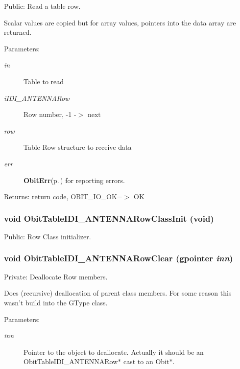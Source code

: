 Public: Read a table row. 

Scalar values are copied but for array values, pointers into the data array are returned. \begin{Desc}
\item[Parameters:]
\begin{description}
\item[{\em in}]Table to read \item[{\em i\-IDI\_\-ANTENNARow}]Row number, -1 -$>$ next \item[{\em row}]Table Row structure to receive data \item[{\em err}]{\bf Obit\-Err}{\rm (p.\,\pageref{structObitErr})} for reporting errors. \end{description}
\end{Desc}
\begin{Desc}
\item[Returns:]return code, OBIT\_\-IO\_\-OK=$>$ OK \end{Desc}
\subsubsection{\setlength{\rightskip}{0pt plus 5cm}void Obit\-Table\-IDI\_\-ANTENNARow\-Class\-Init (void)}\label{ObitTableIDI__ANTENNA_8c_a26}


Public: Row Class initializer. 

\subsubsection{\setlength{\rightskip}{0pt plus 5cm}void Obit\-Table\-IDI\_\-ANTENNARow\-Clear (gpointer {\em inn})}\label{ObitTableIDI__ANTENNA_8c_a7}


Private: Deallocate Row members. 

Does (recursive) deallocation of parent class members. For some reason this wasn't build into the GType class. \begin{Desc}
\item[Parameters:]
\begin{description}
\item[{\em inn}]Pointer to the object to deallocate. Actually it should be an Obit\-Table\-IDI\_\-ANTENNARow$\ast$ cast to an Obit$\ast$. \end{description}
\end{Desc}
